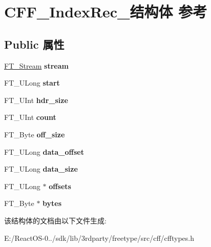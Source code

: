 \hypertarget{struct_c_f_f___index_rec__}{}\section{C\+F\+F\+\_\+\+Index\+Rec\+\_\+结构体 参考}
\label{struct_c_f_f___index_rec__}
\subsection*{Public 属性}
\begin{DoxyCompactItemize}
\item 
\mbox{\label{struct_c_f_f___index_rec___ad5ee08e8fada7dea2f9208d3519bcd5d}} 
\hyperlink{struct_f_t___stream_rec__}{F\+T\+\_\+\+Stream} {\bfseries stream}
\item 
\mbox{\label{struct_c_f_f___index_rec___af267c544c3ef35bba1c827e161eb3e60}} 
F\+T\+\_\+\+U\+Long {\bfseries start}
\item 
\mbox{\label{struct_c_f_f___index_rec___aca0af2af0234255ed3aa1e68000d82b7}} 
F\+T\+\_\+\+U\+Int {\bfseries hdr\+\_\+size}
\item 
\mbox{\label{struct_c_f_f___index_rec___a8e261cee0fe88c39f0604f54618aba95}} 
F\+T\+\_\+\+U\+Int {\bfseries count}
\item 
\mbox{\label{struct_c_f_f___index_rec___a4016721ce95696c435e6d1c38ccf7c12}} 
F\+T\+\_\+\+Byte {\bfseries off\+\_\+size}
\item 
\mbox{\label{struct_c_f_f___index_rec___a9e3d683cc91becae1421c8737b8f176b}} 
F\+T\+\_\+\+U\+Long {\bfseries data\+\_\+offset}
\item 
\mbox{\label{struct_c_f_f___index_rec___a71e1cc8ca3c9188e150d22301e055827}} 
F\+T\+\_\+\+U\+Long {\bfseries data\+\_\+size}
\item 
\mbox{\label{struct_c_f_f___index_rec___a7ac9bbce2cfd2625ab78dd8d4c8e6a39}} 
F\+T\+\_\+\+U\+Long $\ast$ {\bfseries offsets}
\item 
\mbox{\label{struct_c_f_f___index_rec___aaa5d7eabfd5c3c2215e85b221e27f5fd}} 
F\+T\+\_\+\+Byte $\ast$ {\bfseries bytes}
\end{DoxyCompactItemize}


该结构体的文档由以下文件生成\+:\begin{DoxyCompactItemize}
\item 
E\+:/\+React\+O\+S-\/0../sdk/lib/3rdparty/freetype/src/cff/cfftypes.\+h\end{DoxyCompactItemize}
